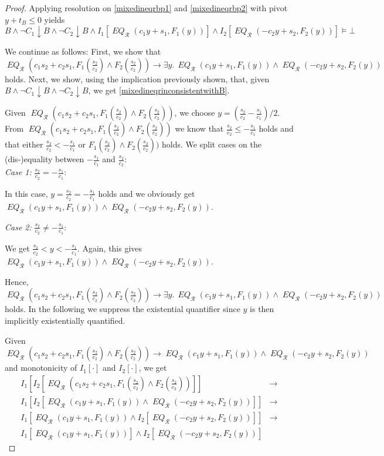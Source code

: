 \documentclass[a4paper]{article}
\theoremstyle{definition}
\newcommand\restrictB{\downarrow B}
\newcommand\mR{\mathcal{R}}
\newcommand\meq{\mathop{\mathit{EQ}}\nolimits}
\newcommand\meqr{\meq_\mR}
\begin{document}
\begin{proof}
  Applying resolution on \ref{mixedineqrbp1} and \ref{mixedineqrbp2} with pivot $y+t_B\le0$ yields
  \begin{equation}
    B\wedge\neg C_1\restrictB\wedge\neg C_2\restrictB\wedge I_1[\meqr(c_1y+s_1,F_1(y))]\wedge I_2[\meqr(-c_2y+s_2,F_2(y))]\models\bot\label{mixedineqrbintermediate1}
  \end{equation}

  We continue as follows:
  First, we show that $\meqr(c_1s_2+c_2s_1,F_1(\frac{s_2}{c_2})\wedge F_2(\frac{s_2}{c_2}))\rightarrow\exists y.\,\meqr(c_1y+s_1,F_1(y))\wedge\meqr(-c_2y+s_2,F_2(y))$ holds.
  Next, we show, using the implication previously shown, that, given $B\wedge\neg C_1\restrictB\wedge\neg C_2\restrictB$, we get \ref{mixedineqrinconsistentwithB}.

  Given $\meqr(c_1s_2+c_2s_1,F_1(\frac{s_2}{c_2})\wedge F_2(\frac{s_2}{c_2}))$, we choose $y=(\frac{s_2}{c_2}-\frac{s_1}{c_1})/2$.
  From $\meqr(c_1s_2+c_2s_1,F_1(\frac{s_2}{c_2})\wedge F_2(\frac{s_2}{c_2}))$ we know that $\frac{s_2}{c_2}\le-\frac{s_1}{c_1}$ holds and that either $\frac{s_2}{c_2}<-\frac{s_1}{c_1}$ or $F_1(\frac{s_2}{c_2})\wedge F_2(\frac{s_2}{c_2}))$ holds.
  We split cases on the (dis-)equality between $-\frac{s_1}{c_1}$ and $\frac{s_2}{c_2}$:\\
  \emph{Case 1:} $\frac{s_2}{c_2}=-\frac{s_1}{c_1}$:

  In this case, $y=\frac{s_2}{c_2}=-\frac{s_1}{c_1}$ holds and we obviously get $\meqr(c_1y+s_1,F_1(y))\wedge\meqr(-c_2y+s_2,F_2(y))$.

  \noindent\emph{Case 2:} $\frac{s_2}{c_2}\ne-\frac{s_1}{c_1}$:
  
  We get $\frac{s_2}{c_2}<y<-\frac{s_1}{c_1}$.
  Again, this gives $\meqr(c_1y+s_1,F_1(y))\wedge\meqr(-c_2y+s_2,F_2(y))$.

  Hence, $\meqr(c_1s_2+c_2s_1,F_1(\frac{s_2}{c_2})\wedge F_2(\frac{s_2}{c_2}))\rightarrow\exists y.\,\meqr(c_1y+s_1,F_1(y))\wedge\meqr(-c_2y+s_2,F_2(y))$ holds.
  In the following we suppress the existential quantifier since $y$ is then implicitly existentially quantified.

  Given $\meqr(c_1s_2+c_2s_1,F_1(\frac{s_2}{c_2})\wedge F_2(\frac{s_2}{c_2}))\rightarrow\meqr(c_1y+s_1,F_1(y))\wedge\meqr(-c_2y+s_2,F_2(y))$ and monotonicity of $I_1[\cdot]$ and $I_2[\cdot]$, we get
  \begin{eqnarray*}
    I_1[I_2[\meqr(c_1s_2+c_2s_1,F_1(\frac{s_2}{c_2})\wedge F_2(\frac{s_2}{c_2}))]]&\rightarrow&\\
    I_1[I_2[\meqr(c_1y+s_1,F_1(y))\wedge\meqr(-c_2y+s_2,F_2(y))]]&\rightarrow&\\
    I_1[\meqr(c_1y+s_1,F_1(y))\wedge I_2[\meqr(-c_2y+s_2,F_2(y))]]&\rightarrow&\\
    I_1[\meqr(c_1y+s_1,F_1(y))]\wedge I_2[\meqr(-c_2y+s_2,F_2(y))]&&
  \end{eqnarray*}


\end{proof}
\end{document}
